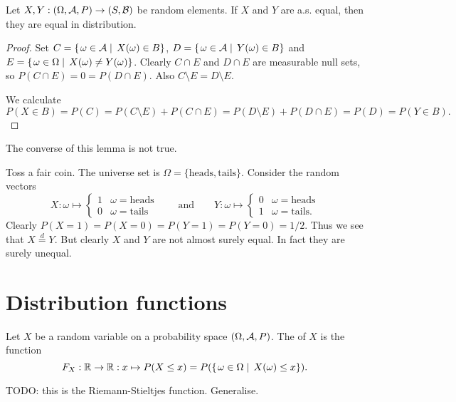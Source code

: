 \begin{lemma}
Let $X, Y: \left( \Omega, \mathcal{A}, P \right) \to \left( S, \mathcal{B} \right)$ be random elements. If $X$ and $Y$ are a.s. equal, then they are equal in distribution.
\end{lemma}
\begin{proof}
Set $C = \left\{\left. \omega\in \mathcal{A} \;\right|\; X(\omega)\in B \right\}$, $D = \left\{\left. \omega\in \mathcal{A} \;\right|\; Y(\omega)\in B \right\}$ and $E = \left\{\left. \omega\in \Omega \;\right|\; X(\omega)\neq Y(\omega) \right\}$. Clearly $C\cap E$ and $D\cap E$ are measurable null sets, so $P(C\cap E) = 0 = P(D\cap E)$. Also $C\setminus E = D\setminus E$.

We calculate
\[ P(X\in B) = P(C) = P(C\setminus E) +P(C\cap E) = P(D\setminus E) +P(D\cap E) = P(D) = P(Y\in B). \]
\end{proof}
The converse of this lemma is not true.
\begin{example}
Toss a fair coin. The universe set is $\Omega = \{\text{heads}, \text{tails}\}$. Consider the random vectors
\[ X: \omega \mapsto \begin{cases}
1 & \omega = \text{heads} \\ 0 & \omega = \text{tails}
\end{cases} \qquad\text{and}\qquad  Y: \omega \mapsto \begin{cases}
0 & \omega = \text{heads} \\ 1 & \omega = \text{tails}.
\end{cases} \]
Clearly $P(X = 1) = P(X = 0) = P(Y = 1) = P(Y = 0) = 1/2$. Thus we see that $X \overset{d}{=} Y$. But clearly $X$ and $Y$ are not almost surely equal. In fact they are surely unequal.
\end{example}

\section{Distribution functions}
\begin{definition}
Let $X$ be a random variable on a probability space $\left( \Omega, \mathcal{A}, P \right)$. The  of $X$ is the function
\[ F_X: \mathbb{R} \to \mathbb{R}: x\mapsto P(X \leq x) = P(\left\{\left. \omega\in \Omega \;\right|\; X(\omega) \leq x \right\}). \]
\end{definition}

TODO: this is the Riemann-Stieltjes function. Generalise.

